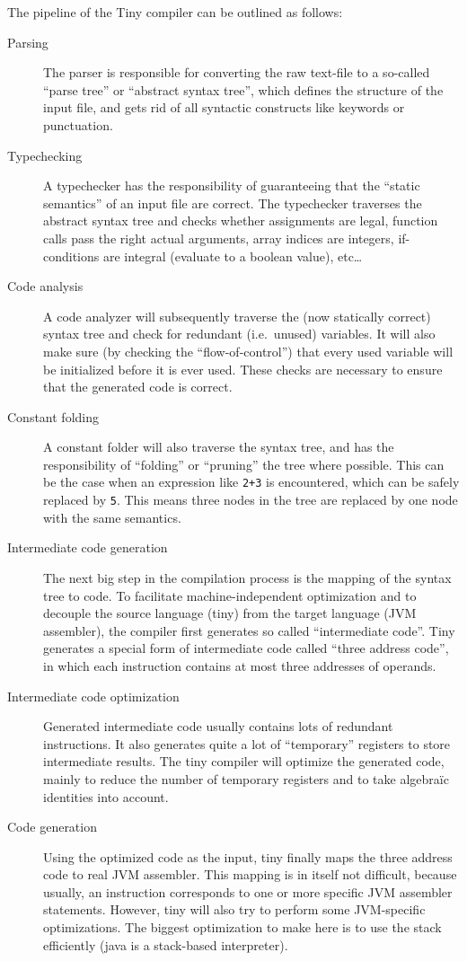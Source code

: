\documentclass[a4paper]{article}
\begin{document}
The pipeline of the Tiny compiler can be outlined as follows:
\begin{description}
\item[Parsing] The parser is responsible for converting the raw text-file to a
so-called ``parse tree'' or ``abstract syntax tree'', which defines the
structure of the input file, and gets rid of all syntactic constructs like
keywords or punctuation.

\item[Typechecking] A typechecker has the responsibility of guaranteeing that the
``static semantics'' of an input file are correct. The typechecker traverses
the abstract syntax tree and checks whether assignments are legal, function
calls pass the right actual arguments, array indices are integers,
if-conditions are integral (evaluate to a boolean value), etc\ldots{}

\item[Code analysis] A code analyzer will subsequently traverse the (now
statically correct) syntax tree and check for redundant (i.e.~unused)
variables. It will also make sure (by checking the ``flow-of-control'') that
every used variable will be initialized before it is ever used. These checks
are necessary to ensure that the generated code is correct.

\item[Constant folding] A constant folder will also traverse the syntax tree,
and has the responsibility of ``folding'' or ``pruning'' the tree where
possible. This can be the case when an expression like \texttt{2+3} is
encountered, which can be safely replaced by \texttt{5}. This means three
nodes in the tree are replaced by one node with the same semantics.

\item[Intermediate code generation] The next big step in the compilation
process is the mapping of the syntax tree to code. To facilitate
machine-independent optimization and to decouple the source language (tiny)
from the target language (JVM assembler), the compiler first generates so
called ``intermediate code''. Tiny generates a special form of intermediate
code called ``three address code'', in which each instruction contains at most
three addresses of operands.

\item[Intermediate code optimization] Generated intermediate code usually
contains lots of redundant instructions. It also generates quite a lot of
``temporary'' registers to store intermediate results. The tiny compiler will
optimize the generated code, mainly to reduce the number of temporary
registers and to take algebra\"ic identities into account.

\item[Code generation] Using the optimized code as the input, tiny finally
maps the three address code to real JVM assembler. This mapping is in itself
not difficult, because usually, an instruction corresponds to one or more
specific JVM assembler statements. However, tiny will also try to perform some
JVM-specific optimizations. The biggest optimization to make here is to use
the stack efficiently (java is a stack-based interpreter).
\end{description}
\end{document}
